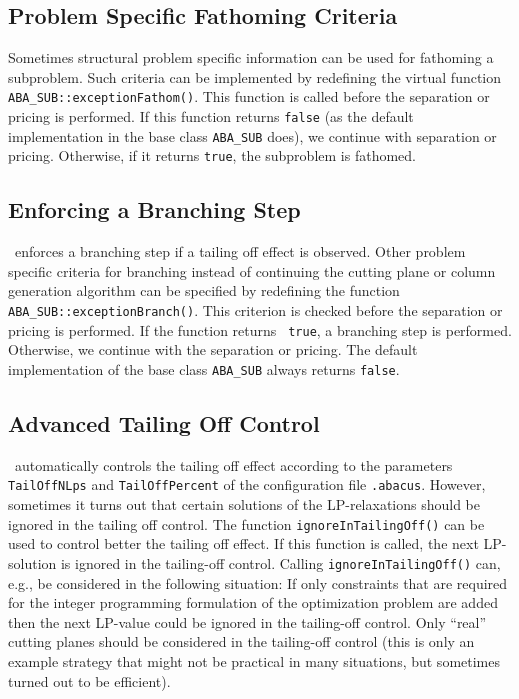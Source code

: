 \subsection{Problem Specific Fathoming Criteria}
\label{section:exceptionFathom}

Sometimes structural problem specific information can be used for
fathoming a subproblem. Such criteria can be implemented by redefining
the virtual function {\tt ABA\_SUB::exceptionFathom()}. This function is
called before the separation or pricing is performed. If this function
returns {\tt false} (as the default implementation in the base class
{\tt ABA\_SUB} does), we continue with separation or pricing. Otherwise, if
it returns {\tt true}, the subproblem is fathomed.

\subsection{Enforcing a Branching Step}
\label{section:exceptionBranch}

\ABACUS\ enforces a branching step if a tailing off effect is
observed. Other problem specific criteria for branching instead of
continuing the cutting plane or column generation algorithm can be
specified by redefining the function {\tt
  ABA\_SUB::exceptionBranch()}. This criterion is checked before the
separation or pricing is performed. If the function returns {\tt
  true}, a branching step is performed. Otherwise, we continue with
the separation or pricing. The default implementation of the base
class {\tt ABA\_SUB} always returns {\tt false}.

\subsection{Advanced Tailing Off Control}
\label{section:ignoreInTailingOff}

\ABACUS\ automatically controls the tailing off effect according to the
parameters {\tt TailOffNLps} and {\tt TailOffPercent} of the
configuration file {\tt .abacus}. However, sometimes it turns out that
certain solutions of the LP-relaxations should be ignored in the
tailing off control. 
The function {\tt ignoreInTailingOff()} can be used to control better
the tailing off effect. If this function is called, the next
LP-solution is ignored in the tailing-off control. Calling 
{\tt ignoreInTailingOff()} can, e.g., be considered in the following
situation: If only constraints that are required for the integer
programming formulation of the optimization problem are added then
the next LP-value could be ignored in the tailing-off control. Only
``real'' cutting planes should be considered in the tailing-off
control (this is only an example strategy that might not be
practical in many situations, but sometimes turned out to be
efficient).


